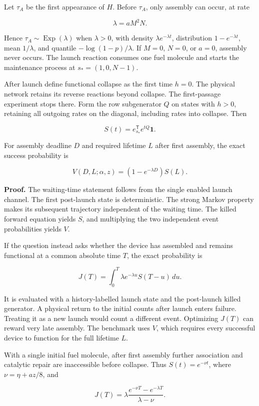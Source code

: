 \documentclass[
  11pt,
]{article}
\begin{document}
Let \(\tau_A\) be the first appearance of \(H\). Before \(\tau_A\), only
assembly can occur, at rate

\[
\lambda=aM^2N.
\]

Hence \(\tau_A\sim\operatorname{Exp}(\lambda)\) when \(\lambda>0\), with
density \(\lambda e^{-\lambda t}\), distribution \(1-e^{-\lambda t}\),
mean \(1/\lambda\), and quantile \(-\log(1-p)/\lambda\). If \(M=0\),
\(N=0\), or \(a=0\), assembly never occurs. The launch reaction consumes
one fuel molecule and starts the maintenance process at
\(s_*=(1,0,N-1)\).

After launch define functional collapse as the first time \(h=0\). The
physical network retains its reverse reactions beyond collapse. The
first-passage experiment stops there. Form the row subgenerator \(Q\) on
states with \(h>0\), retaining all outgoing rates on the diagonal,
including rates into collapse. Then

\[
S(t)=e_{s_*}^{\mathsf T}e^{tQ}\mathbf1.
\]

For assembly deadline \(D\) and required lifetime \(L\) after first
assembly, the exact success probability is

\[
V(D,L;\alpha,z)=(1-e^{-\lambda D})S(L).
\]

\textbf{Proof.} The waiting-time statement follows from the single
enabled launch channel. The first post-launch state is deterministic.
The strong Markov property makes its subsequent trajectory independent
of the waiting time. The killed forward equation yields \(S\), and
multiplying the two independent event probabilities yields \(V\).

If the question instead asks whether the device has assembled and
remains functional at a common absolute time \(T\), the exact
probability is

\[
J(T)=\int_0^T\lambda e^{-\lambda u}S(T-u)\,du.
\]

It is evaluated with a history-labelled launch state and the post-launch
killed generator. A physical return to the initial counts after launch
enters failure. Treating it as a new launch would count a different
event. Optimizing \(J(T)\) can reward very late assembly. The benchmark
uses \(V\), which requires every successful device to function for the
full lifetime \(L\).

With a single initial fuel molecule, after first assembly further
association and catalytic repair are inaccessible before collapse. Thus
\(S(t)=e^{-\nu t}\), where \(\nu=\eta+az/8\), and

\[
J(T)=\lambda\frac{e^{-\nu T}-e^{-\lambda T}}{\lambda-\nu}.
\]
\end{document}
